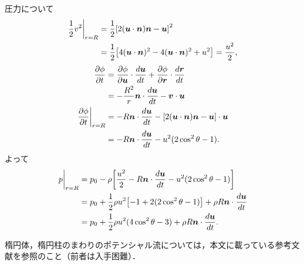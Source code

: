 \begin{kaitou}
圧力について
\begin{align*}
    \eval{\frac{1}{2}v^2}_{r=R} &= \frac{1}{2} \bqty{2(\vec{u}\cdot\vec{n})\vec{n}-\vec{u}}^2 \\
    &= \frac{1}{2} \bqty{ 4(\vec{u}\cdot\vec{n})^2 -4(\vec{u}\cdot\vec{n})^2 +u^2 } = \frac{u^2}{2},
\end{align*}
\begin{align*}
    \pdv{\phi}{t} &= \pdv{\phi}{\vec{u}} \cdot \dv{\vec{u}}{t} + \pdv{\phi}{\vec{r}} \cdot \dv{\vec{r}}{t} \\
    &= -\frac{R^2}{r} \vec{n} \cdot \dv{\vec{u}}{t} - \vec{v} \cdot \vec{u} \\
    \eval{\pdv{\phi}{t}}_{r=R} &= -R \vec{n} \cdot \dv{\vec{u}}{t} - \bqty{2(\vec{u}\cdot\vec{n})\vec{n}-\vec{u}} \cdot \vec{u} \\
    &= -R \vec{n} \cdot \dv{\vec{u}}{t} - u^2 (2\cos^2\theta-1) .
\end{align*}
よって
\begin{align*}
    \eval{p}_{r=R} &= p_0 - \rho\bqty{ \frac{u^2}{2} - R \vec{n} \cdot \dv{\vec{u}}{t} - u^2(2\cos^2\theta-1) } \\
    &= p_0 + \frac{1}{2}\rho u^2 \bqty{ -1 + 2(2\cos^2\theta-1) } + \rho R \vec{n} \cdot \dv{\vec{u}}{t} \\
    &= p_0 + \frac{1}{2}\rho u^2 (4\cos^2\theta-3) + \rho R \vec{n} \cdot \dv{\vec{u}}{t}  .
\end{align*}

\end{kaitou}


\begin{details}
楕円体，楕円柱のまわりのポテンシャル流については，本文に載っている参考文献を参照のこと（前者は入手困難）．
\end{details}


